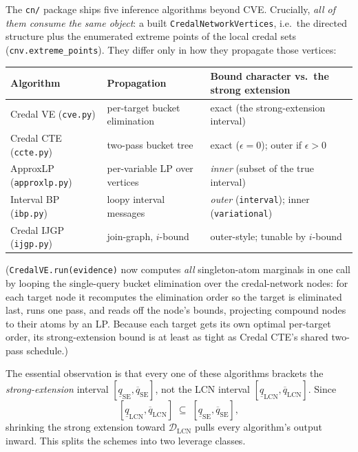 \documentclass[11pt]{article}
\begin{document}
The \texttt{cn/} package ships five inference algorithms beyond CVE. Crucially, \emph{all of
them consume the same object}: a built \texttt{CredalNetworkVertices}, i.e.\ the directed
structure plus the enumerated extreme points of the local credal sets
(\texttt{cnv.extreme\_points}). They differ only in how they propagate those vertices:

\begin{center}
\begin{tabular}{lll}
  \toprule
  Algorithm & Propagation & Bound character vs.\ the strong extension \\
  \midrule
  Credal VE (\texttt{cve.py})    & per-target bucket elimination & exact (the strong-extension interval) \\
  Credal CTE (\texttt{ccte.py})  & two-pass bucket tree        & exact ($\epsilon{=}0$); outer if $\epsilon{>}0$ \\
  ApproxLP (\texttt{approxlp.py})& per-variable LP over vertices & \emph{inner} (subset of the true interval) \\
  Interval BP (\texttt{ibp.py})  & loopy interval messages     & \emph{outer} (\texttt{interval}); inner (\texttt{variational}) \\
  Credal IJGP (\texttt{ijgp.py})  & join-graph, $i$-bound       & outer-style; tunable by $i$-bound \\
  \bottomrule
\end{tabular}
\end{center}

(\texttt{CredalVE.run(evidence)} now computes \emph{all} singleton-atom marginals in one call
by looping the single-query bucket elimination over the credal-network nodes: for each target
node it recomputes the elimination order so the target is eliminated last, runs one pass, and
reads off the node's bounds, projecting compound nodes to their atoms by an LP. Because each
target gets its own optimal per-target order, its strong-extension bound is at least as tight
as Credal CTE's shared two-pass schedule.)

The essential observation is that every one of these algorithms brackets the
\emph{strong-extension} interval $[\underline{q}_{\mathrm{SE}},\overline{q}_{\mathrm{SE}}]$,
not the LCN interval $[\underline{q}_{\mathrm{LCN}},\overline{q}_{\mathrm{LCN}}]$. Since
\[
  [\underline{q}_{\mathrm{LCN}},\overline{q}_{\mathrm{LCN}}]
  \;\subseteq\;
  [\underline{q}_{\mathrm{SE}},\overline{q}_{\mathrm{SE}}],
\]
shrinking the strong extension toward $\mathcal{D}_{\mathrm{LCN}}$ pulls every algorithm's
output inward. This splits the schemes into two leverage classes.
\end{document}
